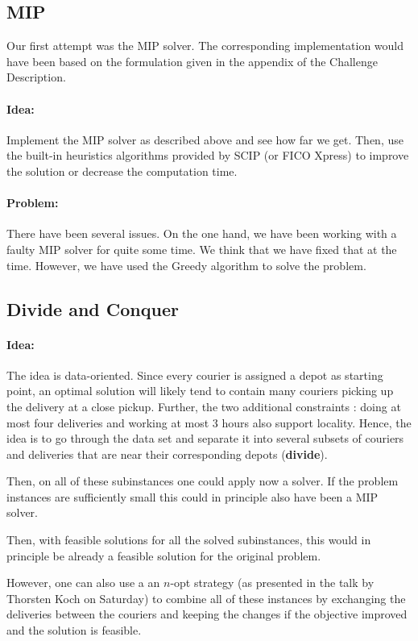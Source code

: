 \documentclass[a4paper]{article}
\begin{document}
\subsection{MIP}
Our first attempt was the MIP solver.
The corresponding implementation would have been based on the formulation given in the appendix of the Challenge Description.

\paragraph{Idea:}
Implement the MIP solver as described above and see how far we get.
Then, use the built-in heuristics algorithms provided by SCIP (or FICO Xpress) to improve the solution or decrease the computation time.

\paragraph{Problem:}
There have been several issues.
On the one hand, we have been working with a faulty MIP solver for quite some time.
We think that we have fixed that at the time.
However, we have used the Greedy algorithm to solve the problem.


\subsection{Divide and Conquer}
\paragraph{Idea:}
The idea is data-oriented.
Since every courier is assigned a depot as starting point, an optimal solution will likely tend to contain many couriers picking up the delivery at a close pickup.
Further, the two additional constraints : doing at most four deliveries and working at most 3 hours also support locality.
Hence, the idea is to go through the data set and separate it into several subsets of couriers and deliveries that are near their corresponding depots (\textbf{divide}).

Then, on all of these subinstances one could apply now a solver.
If the problem instances are sufficiently small this could in principle also have been a MIP solver.

Then, with feasible solutions for all the  solved subinstances, this would in principle be already a feasible solution for the original problem.

However, one can also use a an $n$-opt strategy (as presented in the talk by Thorsten Koch on Saturday) to combine all of these instances by exchanging the deliveries between the couriers and keeping the changes if the objective improved and the solution is feasible.
\end{document}
